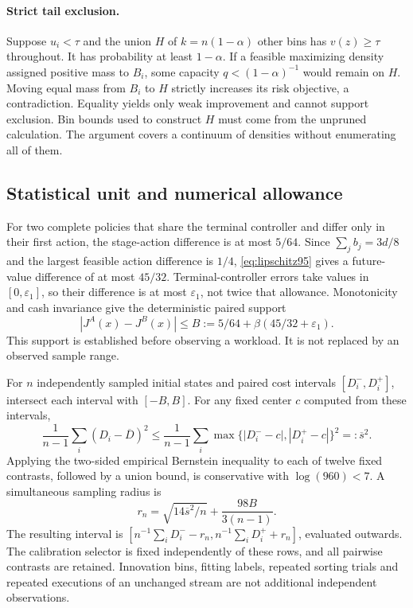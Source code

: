 \paragraph{Strict tail exclusion.}
Suppose $u_i<\tau$ and the union $H$ of $k=n(1-\alpha)$ other bins has $v(z)\geq\tau$ throughout. It has probability at least $1-\alpha$. If a feasible maximizing density assigned positive mass to $B_i$, some capacity $q<(1-\alpha)^{-1}$ would remain on $H$. Moving equal mass from $B_i$ to $H$ strictly increases its risk objective, a contradiction. Equality yields only weak improvement and cannot support exclusion. Bin bounds used to construct $H$ must come from the unpruned calculation. The argument covers a continuum of densities without enumerating all of them.

\subsection{Statistical unit and numerical allowance}
For two complete policies that share the terminal controller and differ only in their first action, the stage-action difference is at most $5/64$. Since $\sum_j b_j=3d/8$ and the largest feasible action difference is $1/4$, \eqref{eq:lipschitz95} gives a future-value difference of at most $45/32$. Terminal-controller errors take values in $[0,\varepsilon_1]$, so their difference is at most $\varepsilon_1$, not twice that allowance. Monotonicity and cash invariance give the deterministic paired support
\[
 |J^A(x)-J^B(x)|\leq B:=5/64+\beta(45/32+\varepsilon_1).
\]
This support is established before observing a workload. It is not replaced by an observed sample range.

For $n$ independently sampled initial states and paired cost intervals $[D_i^-,D_i^+]$, intersect each interval with $[-B,B]$. For any fixed center $c$ computed from these intervals,
\[
 \frac1{n-1}\sum_i(D_i-\overline D)^2
 \leq\frac1{n-1}\sum_i\max\{|D_i^--c|,|D_i^+-c|\}^2=:\overline s^2.
\]
Applying the two-sided empirical Bernstein inequality \citep{maurer2009} to each of twelve fixed contrasts, followed by a union bound, is conservative with $\log(960)<7$. A simultaneous sampling radius is
\[
 r_n=\sqrt{14\overline s^2/n}+\frac{98B}{3(n-1)}.
\]
The resulting interval is $[n^{-1}\sum_iD_i^- -r_n,n^{-1}\sum_iD_i^+ +r_n]$, evaluated outwards. The calibration selector is fixed independently of these rows, and all pairwise contrasts are retained. Innovation bins, fitting labels, repeated sorting trials and repeated executions of an unchanged stream are not additional independent observations.

